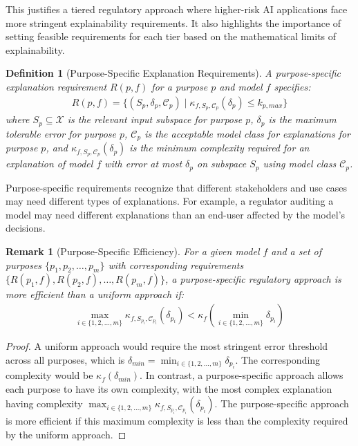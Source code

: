 \documentclass[11pt,letter,leqno]{article}
\newtheorem{definition}[theorem]{Definition}
\newtheorem{remark}[theorem]{Remark}
\begin{document}
This justifies a tiered regulatory approach where higher-risk AI applications face more stringent explainability requirements.  It also highlights the importance of setting feasible requirements for each tier based on the mathematical limits of explainability.

\begin{definition}[Purpose-Specific Explanation Requirements]
\label{def:purpose-specific}
A purpose-specific explanation requirement $R(p, f)$ for a purpose $p$ and model $f$ specifies:
\begin{align}
R(p, f) = \{(S_p, \delta_p, \mathcal{C}_p) \mid \kappa_{f,S_p,\mathcal{C}_p}(\delta_p) \leq k_{p,max}\}
\end{align}
where $S_p \subseteq \mathcal{X}$ is the relevant input subspace for purpose $p$, $\delta_p$ is the maximum tolerable error for purpose $p$, $\mathcal{C}_p$ is the acceptable model class for explanations for purpose $p$, and $\kappa_{f,S_p,\mathcal{C}_p}(\delta_p)$ is the minimum complexity required for an explanation of model $f$ with error at most $\delta_p$ on subspace $S_p$ using model class $\mathcal{C}_p$.
\end{definition}

Purpose-specific requirements recognize that different stakeholders and use cases may need different types of explanations. For example, a regulator auditing a model may need different explanations than an end-user affected by the model's decisions.

\begin{remark}[Purpose-Specific Efficiency]
\label{thm:purpose-efficiency}
For a given model $f$ and a set of purposes $\{p_1, p_2, \ldots, p_m\}$ with corresponding requirements $\{R(p_1, f), R(p_2, f), \ldots, R(p_m, f)\}$, a purpose-specific regulatory approach is more efficient than a uniform approach if:
\begin{align}
\max_{i \in \{1, 2, \ldots, m\}} \kappa_{f,S_{p_i},\mathcal{C}_{p_i}}(\delta_{p_i}) < \kappa_f(\min_{i \in \{1, 2, \ldots, m\}} \delta_{p_i})
\end{align}
\end{remark}

\begin{proof}
A uniform approach would require the most stringent error threshold across all purposes, which is $\delta_{min} = \min_{i \in \{1, 2, \ldots, m\}} \delta_{p_i}$. The corresponding complexity would be $\kappa_f(\delta_{min})$.  In contrast, a purpose-specific approach allows each purpose to have its own complexity, with the most complex explanation having complexity $\max_{i \in \{1, 2, \ldots, m\}} \kappa_{f,S_{p_i},\mathcal{C}_{p_i}}(\delta_{p_i})$.  The purpose-specific approach is more efficient if this maximum complexity is less than the complexity required by the uniform approach.
\end{proof}
\end{document}
